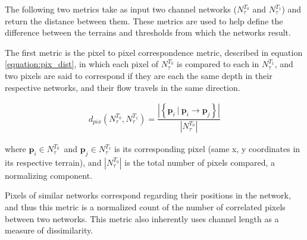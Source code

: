 The following two metrics take as input two channel networks
($N^{T_{0}}_{\tau}$ and $N^{T_{1}}_{\tau}$) and return the distance between
them. These metrics are used to help define the difference between the
terrains and thresholds from which the networks result. 


The first metric is the pixel to pixel correspondence metric, described in equation \ref{equation:pix_dist}, in which
each pixel of $N^{T_{0}}_{\tau}$ is compared to each in $N^{T_{1}}_{\tau}$,
and two pixels are said to correspond if 
they are each the same depth in their respective networks,
and their flow travels in the same direction. 

\begin{align}
\label{equation:pix_dist}
  d_{pix} \left( N^{T_{0}}_{\tau}, N^{T_{1}}_{\tau} \right) = \dfrac{ \left| \left\{ \textbf{p}_{i} \  | \ \textbf{p}_{i} \rightarrow \textbf{p}_{j} \right\} \right| }{ \left| N^{T_{0}}_{\tau} \right|  }
\end{align}

\noindent where $\textbf{p}_{i} \in N^{T_{0}}_{\tau}\,$ and
$\textbf{p}_{j} \in N^{T_{1}}_{\tau}$ is its corresponding pixel (same x,
y coordinates in its respective terrain), and $\left| N^{T_{0}}_{\tau}
\right|$ is the total number of pixels compared, a normalizing
component.

Pixels of similar networks correspond regarding their positions in the network, and thus this metric is a normalized count of the number of correlated pixels between two networks. This metric also inherently uses channel length as a measure of dissimilarity.

